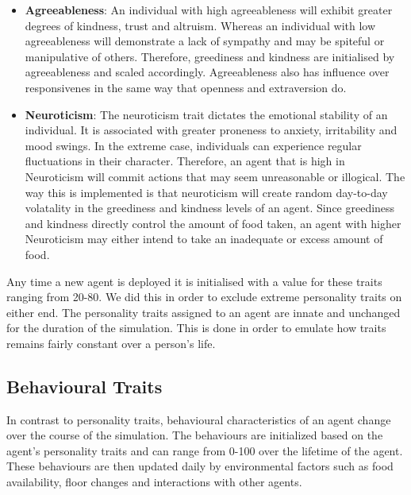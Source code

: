 \begin{itemize}
    \item  \textbf{Agreeableness}: An individual with high agreeableness will exhibit greater degrees of kindness, trust and altruism. Whereas an individual with low agreeableness will demonstrate a lack of sympathy and may be spiteful or manipulative of others. Therefore, greediness and kindness are initialised by agreeableness and scaled accordingly. Agreeableness also has influence over responsivenes in the same way that openness and extraversion do.
    \item  \textbf{Neuroticism}: The neuroticism trait dictates the emotional stability of an individual. It is associated with greater proneness to anxiety, irritability and mood swings. In the extreme case, individuals can experience regular fluctuations in their character. Therefore, an agent that is high in Neuroticism will commit actions that may seem unreasonable or illogical. The way this is implemented is that neuroticism will create random day-to-day volatality in the greediness and kindness levels of an agent. Since greediness and kindness directly control the amount of food taken, an agent with higher Neuroticism may either intend to take an inadequate or excess amount of food.
\end{itemize}

Any time a new agent is deployed it is initialised with a value for these traits ranging from 20-80. We did this in order to exclude extreme personality traits on either end. The personality traits assigned to an agent are innate and unchanged for the duration of the simulation. This is done in order to emulate how traits remains fairly constant over a person's life.

\subsection{Behavioural Traits}
\label{subsec: Behaviour}
In contrast to personality traits, behavioural characteristics of an agent change over the course of the simulation. The behaviours are initialized based on the agent's personality traits and can range from 0-100 over the lifetime of the agent. These behaviours are then updated daily by environmental factors such as food availability, floor changes and interactions with other agents. 

